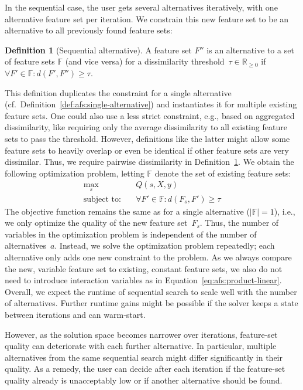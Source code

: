 \documentclass{article}
\theoremstyle{definition}
\newtheorem{definition}[corollary]{Definition}
\begin{document}
In the sequential case, the user gets several alternatives iteratively, with one alternative feature set per iteration.
We constrain this new feature set to be an alternative to all previously found feature sets:
%
\begin{definition}[Sequential alternative]
	A feature set $F''$ is an alternative to a set of feature sets $\mathbb{F}$ (and vice versa) for a dissimilarity threshold~$\tau \in \mathbb{R}_{\geq 0}$ if $\forall F' \in \mathbb{F}: d(F',F'') \geq \tau$.
	\label{def:afs:sequential-alternative}
\end{definition}
%
This definition duplicates the constraint for a single alternative (cf.~Definition~\ref{def:afs:single-alternative}) and instantiates it for multiple existing feature sets.
One could also use a less strict constraint, e.g., based on aggregated dissimilarity, like requiring only the average dissimilarity to all existing feature sets to pass the threshold.
However, definitions like the latter might allow some feature sets to heavily overlap or even be identical if other feature sets are very dissimilar.
Thus, we require pairwise dissimilarity in Definition~\ref{def:afs:sequential-alternative}.
We obtain the following optimization problem, letting $\mathbb{F}$ denote the set of existing feature sets:
%
\begin{equation}
	\begin{aligned}
		\max_s &\quad Q(s,X,y) \\
		\text{subject to:} &\quad \forall F' \in \mathbb{F}: d(F_s,F') \geq \tau
	\end{aligned}
	\label{eq:afs:afs-sequential}
\end{equation}
%
The objective function remains the same as for a single alternative ($|\mathbb{F}| = 1$), i.e., we only optimize the quality of the new feature set~$F_s$.
Thus, the number of variables in the optimization problem is independent of the number of alternatives~$a$.
Instead, we solve the optimization problem repeatedly; each alternative only adds one new constraint to the problem.
As we always compare the new, variable feature set to existing, constant feature sets, we also do not need to introduce interaction variables as in Equation~\ref{eq:afs:product-linear}.
Overall, we expect the runtime of sequential search to scale well with the number of alternatives.
Further runtime gains might be possible if the solver keeps a state between iterations and can warm-start.

However, as the solution space becomes narrower over iterations, feature-set quality can deteriorate with each further alternative.
In particular, multiple alternatives from the same sequential search might differ significantly in their quality.
As a remedy, the user can decide after each iteration if the feature-set quality already is unacceptably low or if another alternative should be found.
\end{document}
